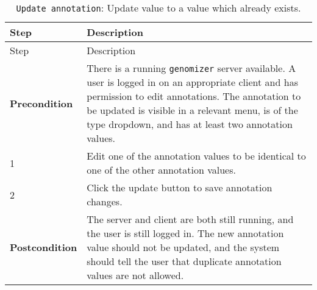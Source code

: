 \begin{longtable}[c]{@{}ll@{}}
\caption{\texttt{Update\ annotation}: Update value to a value which
already exists.}\tabularnewline
\toprule
\begin{minipage}[b]{0.31\columnwidth}\raggedright\strut
Step
\strut\end{minipage} &
\begin{minipage}[b]{0.63\columnwidth}\raggedright\strut
Description
\strut\end{minipage}\tabularnewline
\midrule
\endfirsthead
\toprule
\begin{minipage}[b]{0.31\columnwidth}\raggedright\strut
Step
\strut\end{minipage} &
\begin{minipage}[b]{0.63\columnwidth}\raggedright\strut
Description
\strut\end{minipage}\tabularnewline
\midrule
\endhead
\begin{minipage}[t]{0.31\columnwidth}\raggedright\strut
\textbf{Precondition}
\strut\end{minipage} &
\begin{minipage}[t]{0.63\columnwidth}\raggedright\strut
There is a running \texttt{genomizer} server available. A user is logged
in on an appropriate client and has permission to edit annotations. The
annotation to be updated is visible in a relevant menu, is of the type
dropdown, and has at least two annotation values.
\strut\end{minipage}\tabularnewline
\begin{minipage}[t]{0.31\columnwidth}\raggedright\strut
1
\strut\end{minipage} &
\begin{minipage}[t]{0.63\columnwidth}\raggedright\strut
Edit one of the annotation values to be identical to one of the other
annotation values.
\strut\end{minipage}\tabularnewline
\begin{minipage}[t]{0.31\columnwidth}\raggedright\strut
2
\strut\end{minipage} &
\begin{minipage}[t]{0.63\columnwidth}\raggedright\strut
Click the update button to save annotation changes.
\strut\end{minipage}\tabularnewline
\begin{minipage}[t]{0.31\columnwidth}\raggedright\strut
\textbf{Postcondition}
\strut\end{minipage} &
\begin{minipage}[t]{0.63\columnwidth}\raggedright\strut
The server and client are both still running, and the user is still
logged in. The new annotation value should not be updated, and the
system should tell the user that duplicate annotation values are not
allowed.
\strut\end{minipage}\tabularnewline
\bottomrule
\end{longtable}

